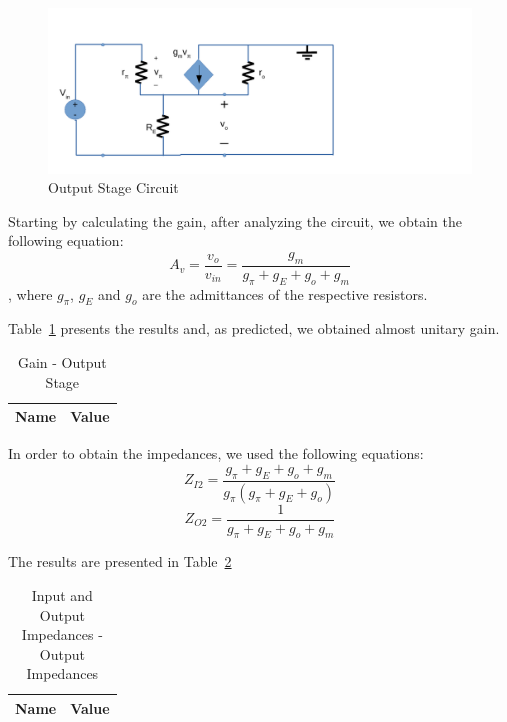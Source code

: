 \begin{figure}[H] \centering
\includegraphics[width=0.8\linewidth]{incrementalos.pdf}
\caption{Output Stage Circuit}                                     %
\label{fig:osincrem}
\end{figure}

Starting by calculating the gain, after analyzing the circuit, we obtain the following equation: 
\begin{equation}
	A_v=\frac{v_o}{v_{in}}=\frac{g_m}{g_\pi+g_E+g_o+g_m}
\end{equation}
, where $g_\pi$, $g_E$ and $g_o$ are the admittances of the respective resistors.

Table~\ref{tab:osav} presents the results and, as predicted, we obtained almost unitary gain.

\begin{table}[H]
  \centering
  \begin{tabular}{|l|r|}
     \hline    
    {\bf Name} & {\bf Value} \\ \hline   
    
  \end{tabular}
  \caption{Gain - Output Stage}
  \label{tab:osav}
\end{table}

In order to obtain the impedances, we used the following equations:
\begin{equation}
	Z_{I2}=\frac{g_\pi+g_E+g_o+g_m}{g_\pi(g_\pi+g_E+g_o)}
\end{equation}
\begin{equation}
	Z_{O2}=\frac{1}{g_\pi+g_E+g_o+g_m}
\end{equation}

The results are presented in Table~\ref{tab:osz}

\begin{table}[H]
  \centering
  \begin{tabular}{|l|r|}
     \hline    
    {\bf Name} & {\bf Value} \\ \hline   
    
  \end{tabular}
  \caption{Input and Output Impedances - Output Impedances}
  \label{tab:osz}
\end{table}


